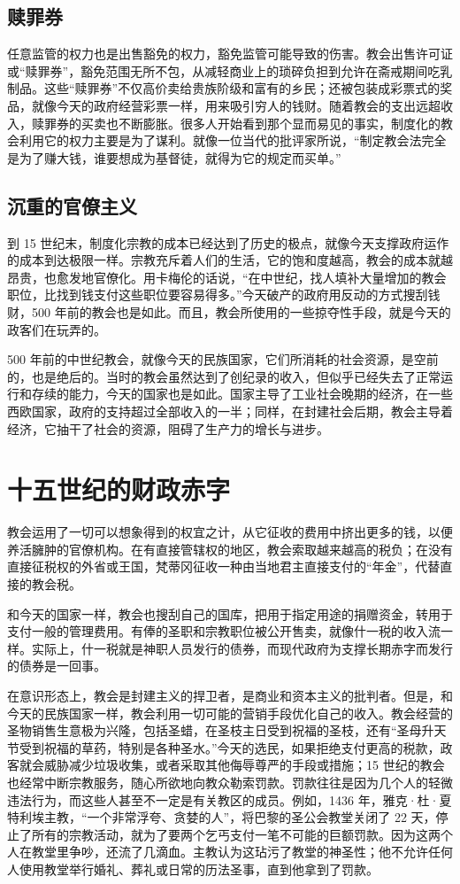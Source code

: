 \subsection{赎罪券}
任意监管的权力也是出售豁免的权力，豁免监管可能导致的伤害。教会出售许可证或“赎罪券”，豁免范围无所不包，从减轻商业上的琐碎负担到允许在斋戒期间吃乳制品。这些“赎罪券”不仅高价卖给贵族阶级和富有的乡民；还被包装成彩票式的奖品，就像今天的政府经营彩票一样，用来吸引穷人的钱财。随着教会的支出远超收入，赎罪券的买卖也不断膨胀。很多人开始看到那个显而易见的事实，制度化的教会利用它的权力主要是为了谋利。就像一位当代的批评家所说，“制定教会法完全是为了赚大钱，谁要想成为基督徒，就得为它的规定而买单。”
\subsection{沉重的官僚主义}
到 15 世纪末，制度化宗教的成本已经达到了历史的极点，就像今天支撑政府运作的成本到达极限一样。宗教充斥着人们的生活，它的饱和度越高，教会的成本就越昂贵，也愈发地官僚化。用卡梅伦的话说，“在中世纪，找人填补大量增加的教会职位，比找到钱支付这些职位要容易得多。”今天破产的政府用反动的方式搜刮钱财，500 年前的教会也是如此。而且，教会所使用的一些掠夺性手段，就是今天的政客们在玩弄的。

500 年前的中世纪教会，就像今天的民族国家，它们所消耗的社会资源，是空前的，也是绝后的。当时的教会虽然达到了创纪录的收入，但似乎已经失去了正常运行和存续的能力，今天的国家也是如此。国家主导了工业社会晚期的经济，在一些西欧国家，政府的支持超过全部收入的一半；同样，在封建社会后期，教会主导着经济，它抽干了社会的资源，阻碍了生产力的增长与进步。

\section{十五世纪的财政赤字}
教会运用了一切可以想象得到的权宜之计，从它征收的费用中挤出更多的钱，以便养活臃肿的官僚机构。在有直接管辖权的地区，教会索取越来越高的税负；在没有直接征税权的外省或王国，梵蒂冈征收一种由当地君主直接支付的“年金”，代替直接的教会税。

和今天的国家一样，教会也搜刮自己的国库，把用于指定用途的捐赠资金，转用于支付一般的管理费用。有俸的圣职和宗教职位被公开售卖，就像什一税的收入流一样。实际上，什一税就是神职人员发行的债券，而现代政府为支撑长期赤字而发行的债券是一回事。

在意识形态上，教会是封建主义的捍卫者，是商业和资本主义的批判者。但是，和今天的民族国家一样，教会利用一切可能的营销手段优化自己的收入。教会经营的圣物销售生意极为兴隆，包括圣蜡，在圣枝主日受到祝福的圣枝，还有“圣母升天节受到祝福的草药，特别是各种圣水。”今天的选民，如果拒绝支付更高的税款，政客就会威胁减少垃圾收集，或者采取其他侮辱尊严的手段或措施；15 世纪的教会也经常中断宗教服务，随心所欲地向教众勒索罚款。罚款往往是因为几个人的轻微违法行为，而这些人甚至不一定是有关教区的成员。例如，1436 年，雅克·杜·夏特利埃主教，“一个非常浮夸、贪婪的人”，将巴黎的圣公会教堂关闭了 22 天，停止了所有的宗教活动，就为了要两个乞丐支付一笔不可能的巨额罚款。因为这两个人在教堂里争吵，还流了几滴血。主教认为这玷污了教堂的神圣性；他不允许任何人使用教堂举行婚礼、葬礼或日常的历法圣事，直到他拿到了罚款。

